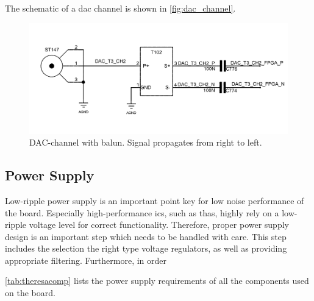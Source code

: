 The schematic of a \gls{dac} channel is shown in \autoref{fig:dac_channel}.
\begin{figure}[tb]
	\centering
	\includegraphics[width = \textwidth]{chap/04-theresa/img/schematic/dac_channel}
	\caption{DAC-channel with balun. Signal propagates from right to left.}
	\label{fig:dac_channel}
\end{figure}


\subsection{Power Supply}
Low-ripple power supply is an important point key for low noise performance of the board. Especially high-performance \Glspl{ic}, such as \glspl{tha}, highly rely on a low-ripple voltage level for correct functionality. 
Therefore, proper power supply design is an important step which needs to be handled with care.
This step includes the selection the right type voltage regulators, as well as providing appropriate filtering. 
Furthermore, in order 

\autoref{tab:theresacomp} lists the power supply requirements of all the components used on the board.


